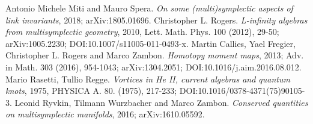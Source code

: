 \documentclass[11pt,a4paper,twoside]{article}
\begin{document}
\begin{thebibliography}{99}
		Antonio Michele Miti and Mauro Spera.
		\newblock \emph{On some (multi)symplectic aspects of link invariants}, 2018;
		\newblock arXiv:1805.01696.
		Christopher L. Rogers.
		\newblock \emph{L-infinity algebras from multisymplectic geometry}, 2010,
		\newblock Lett. Math. Phys. 100 (2012), 29-50;
		\newblock arXiv:1005.2230;
		\newblock DOI:10.1007/s11005-011-0493-x.
		Martin Callies, Yael Fregier, Christopher L. Rogers and Marco Zambon.
		\newblock \emph{Homotopy moment maps}, 2013;
		\newblock Adv. in Math. 303 (2016), 954-1043;
		\newblock arXiv:1304.2051;
		\newblock DOI:10.1016/j.aim.2016.08.012.
		Mario Rasetti, Tullio Regge.
		\newblock \emph{Vortices in He II, current algebras and quantum knots}, 1975,
		\newblock PHYSICA A. 80. (1975), 217-233;
		\newblock DOI:10.1016/0378-4371(75)90105-3. 
		Leonid Ryvkin, Tilmann Wurzbacher and Marco Zambon.
		\newblock \emph{Conserved quantities on multisymplectic manifolds}, 2016;
		\newblock arXiv:1610.05592.
\end{thebibliography}
\end{document}
